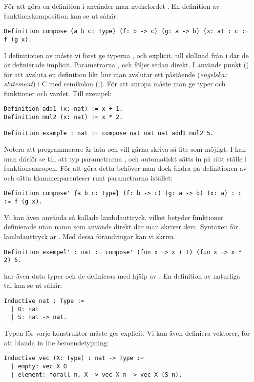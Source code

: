 För att göra en definition i \coq{} använder man nyckelordet . En
definition av funktionskomposition kan se ut såhär:
\begin{lstlisting}
Definition compose (a b c: Type) (f: b -> c) (g: a -> b) (x: a) : c := f (g x).
\end{lstlisting}
I definitionen av  måste vi först ge typerna ,  och 
explicit, till skillnad från i \haskell{} där de är definierade implicit.
Parametrarna ,  och  följer sedan direkt. I \coq{} används punkt
() för att avsluta en definition likt hur man avslutar ett påstående
(\emph{engelska: statement}) i C med semikolon (;). För att anropa 
måste man ge typer och funktioner och värdet. Till exempel:
\begin{lstlisting}
Definition add1 (x: nat) := x + 1.
Definition mul2 (x: nat) := x * 2.

Definition example : nat := compose nat nat nat add1 mul2 5.
\end{lstlisting}
Notera att programmerare är lata och vill gärna skriva så lite som möjligt. I
\coq{} kan man därför se till att typ parametrarna ,  och 
automatiskt sätts in på rätt ställe i funktionsanropen. För att göra detta
behöver man dock ändra på definitionen av  och sätta
klammerparenteser runt parametrarna istället:
\begin{lstlisting}
Definition compose' {a b c: Type} (f: b -> c) (g: a -> b) (x: a) : c := f (g x).
\end{lstlisting}
Vi kan även använda så kallade lambdauttryck, vilket betyder funktioner
definierade utan namn som används direkt där man skriver dem. Syntaxen för
lambdauttryck är . Med dessa förändringar kan
vi skriva
\begin{lstlisting}
Definition exempel' : nat := compose' (fun x => x + 1) (fun x => x * 2) 5.
\end{lstlisting}
\coq{} har även data typer och de definieras med hjälp av . En
definition av naturliga tal kan se ut såhär:
\begin{lstlisting}
Inductive nat : Type :=
  | O: nat
  | S: nat -> nat.
\end{lstlisting}
Typen för varje konstruktor måste ges explicit. Vi kan även definiera vektorer, för
att blanda in lite beroendetypning:
\begin{lstlisting}
Inductive vec (X: Type) : nat -> Type :=
  | empty: vec X O
  | element: forall n, X -> vec X n -> vec X (S n).
\end{lstlisting}
